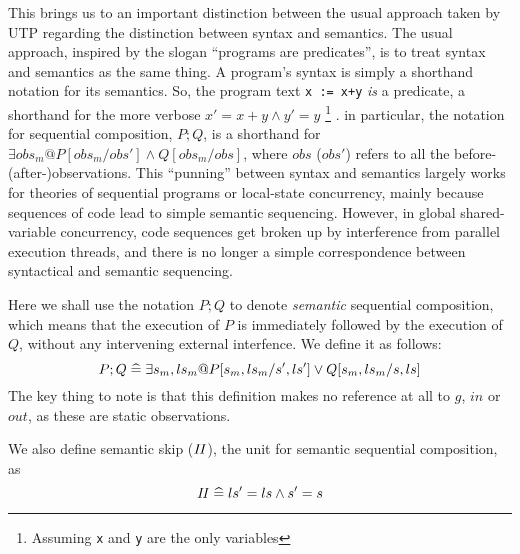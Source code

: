 This brings us to an important distinction between the usual approach
taken by UTP regarding the distinction between syntax and semantics.
The usual approach,
inspired by the slogan ``programs are predicates''\cite{predprog,conf/mlpl/Hoare85},
is to treat syntax and semantics as the same thing.
A program's syntax is simply a shorthand notation for its semantics.
So, the program text \texttt{x := x+y} \emph{is} a predicate,
a shorthand for the more verbose $x' = x + y \land y' = y$
\footnote{Assuming \texttt{x} and \texttt{y} are the only variables}
.
in particular, the notation for sequential composition, $P ; Q$,
is a shorthand for
$\exists obs_m @ P[obs_m/obs'] \land Q[obs_m/obs]$,
where $obs$ ($obs'$) refers to all the before- (after-)observations.
This ``punning'' between syntax and semantics largely works for theories
of sequential programs or local-state concurrency,
mainly because sequences of code lead to simple semantic sequencing.
However, in global shared-variable concurrency,
code sequences get broken up by interference from parallel execution threads,
and there is no longer a simple correspondence between syntactical and semantic
sequencing.

Here we shall use the notation $P;Q$
to denote \emph{semantic} sequential composition,
which means that the execution of $P$ is immediately followed by the
execution of $Q$, without any intervening external interfence.
We define it as follows:
\begin{equation}
   P ; Q \mathrel{\widehat=} \exists s_m, ls_m @ P[s_m,ls_m/s',ls'] \lor Q[s_m,ls_m/s,ls]
   \label{eqn:semantic-;}
\end{equation}
The key thing to note is that this definition makes no reference at all
to $g$, $in$ or $out$,
as these are static observations.

We also define semantic skip ($\mathit{II}$),
the unit for semantic sequential composition,
as
\begin{equation}
  \mathit{II} \mathrel{\widehat=} ls' = ls \land s' = s
\end{equation}
